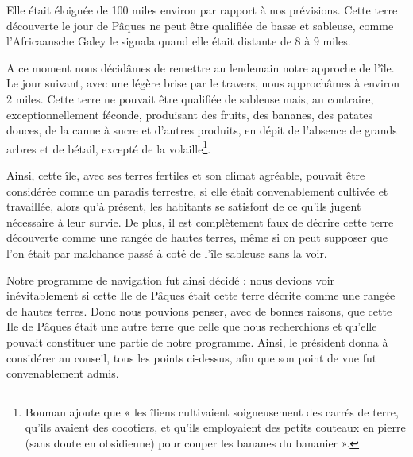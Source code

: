 \documentclass{article}
\begin{document}
        
    Elle était éloignée de 100 miles environ par rapport à nos prévisions. Cette terre découverte le jour de Pâques ne peut être qualifiée de basse et sableuse, comme l'Africaansche Galey le signala quand elle était distante de 8 à 9 miles. 
            
        
    A ce moment nous décidâmes de remettre au lendemain notre approche de l'île. Le jour suivant, avec une légère brise par le travers, nous approchâmes à environ 2 miles. Cette terre ne pouvait être qualifiée de sableuse mais, au contraire, exceptionnellement féconde, produisant des fruits, des bananes, des patates douces, de la canne à sucre et d'autres produits, en dépit de l'absence de grands arbres et de bétail, excepté de la volaille\footnote{Bouman ajoute que « les îliens cultivaient soigneusement des carrés de terre, qu'ils avaient des cocotiers, et qu'ils employaient des petits couteaux en pierre (sans doute en obsidienne) pour couper les bananes du bananier ».}.
            
        
    Ainsi, cette île, avec ses terres fertiles et son climat agréable, pouvait être considérée comme un paradis terrestre, si elle était convenablement cultivée et travaillée, alors qu'à présent, les habitants se satisfont de ce qu'ils jugent nécessaire à leur survie. De plus, il est complètement faux de décrire cette terre découverte comme une rangée de hautes terres, même si on peut supposer que l'on était par malchance passé à coté de l'île sableuse sans la voir.
            
        
    Notre programme de navigation fut ainsi décidé : nous devions voir inévitablement si cette Ile de Pâques était cette terre décrite comme une rangée de hautes terres. Donc nous pouvions penser, avec de bonnes raisons, que cette Ile de Pâques était une autre terre que celle que nous recherchions et qu'elle pouvait constituer une partie de notre programme. Ainsi, le président donna à considérer au conseil, tous les points ci-dessus, afin que son point de vue fut convenablement admis.
            
\end{document}
